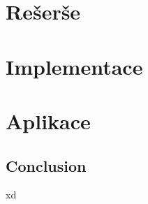\documentclass{ctuthesis}
\begin{document}
\maketitle



\part{Rešerše}



\part{Implementace}



\part{Aplikace}

\chapter{Conclusion}

xd~\cite{key}

\printbibliography{}
\end{document}
